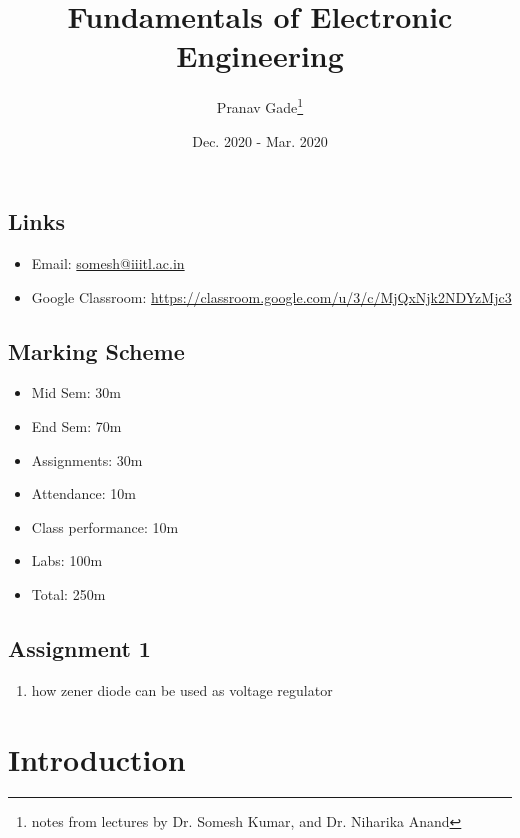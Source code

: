 \documentclass[10pt, a4paper]{report}
\author{Pranav Gade\thanks{notes from lectures by Dr. Somesh Kumar, and Dr. Niharika Anand}}
\date{Dec. 2020 - Mar. 2020}
\title{Fundamentals of Electronic Engineering}
\begin{document}
	\maketitle
	\section*{Links}
	\begin{itemize}
		\item Email: \href{somesh@iiitl.ac.in}{somesh@iiitl.ac.in}
		\item Google Classroom: \href{https://classroom.google.com/u/3/c/MjQxNjk2NDYzMjc3}{https://classroom.google.com/u/3/c/MjQxNjk2NDYzMjc3}
	\end{itemize}
	\section*{Marking Scheme}
	\begin{itemize}
		\item Mid Sem: 30m
		\item End Sem: 70m
		\item Assignments: 30m
		\item Attendance: 10m
		\item Class performance: 10m
		\item Labs: 100m
		\item Total: 250m
	\end{itemize}
	\section*{Assignment 1}
	\begin{enumerate}
		\item how zener diode can be used as voltage regulator
	\end{enumerate}
	\newpage
	
	\chapter{Introduction}	
\end{document}
